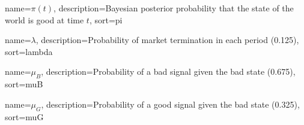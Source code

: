
{
  name={\ensuremath{\pi(t)}},
  description={Bayesian posterior probability that the state of the world is good at time $t$},
  sort=pi
}

{
  name={\ensuremath{\lambda}},
  description={Probability of market termination in each period (0.125)},
  sort=lambda
}

{
  name={\ensuremath{\mu_B}},
  description={Probability of a bad signal given the bad state (0.675)},
  sort=muB
}

{
  name={\ensuremath{\mu_G}},
  description={Probability of a good signal given the bad state (0.325)},
  sort=muG
}
